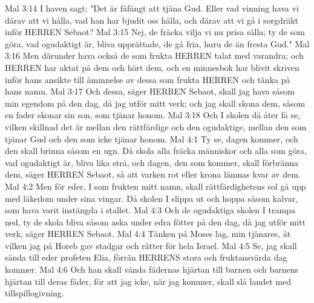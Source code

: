 Mal 3:14  I haven sagt: "Det är fåfängt att tjäna Gud. Eller vad vinning hava vi därav att vi hålla, vad han har bjudit oss hålla, och därav att vi gå i sorgdräkt inför HERREN Sebaot?
Mal 3:15  Nej, de fräcka vilja vi nu prisa sälla; ty de som göra, vad ogudaktigt är, bliva upprättade, de gå fria, huru de än fresta Gud."
Mal 3:16  Men därunder hava också de som frukta HERREN talat med varandra; och HERREN har aktat på dem och hört dem, och en minnesbok har blivit skriven inför hans ansikte till åminnelse av dessa som frukta HERREN och tänka på hans namn.
Mal 3:17  Och dessa, säger HERREN Sebaot, skall jag hava såsom min egendom på den dag, då jag utför mitt verk; och jag skall skona dem, såsom en fader skonar sin son, som tjänar honom.
Mal 3:18  Och I skolen då åter få se, vilken skillnad det är mellan den rättfärdige och den ogudaktige, mellan den som tjänar Gud och den som icke tjänar honom.
Mal 4:1  Ty se, dagen kommer, och den skall brinna såsom en ugn. Då skola alla fräcka människor och alla som göra, vad ogudaktigt är, bliva lika strå, och dagen, den som kommer, skall förbränna dem, säger HERREN Sebaot, så att varken rot eller krona lämnas kvar av dem.
Mal 4:2  Men för eder, I som frukten mitt namn, skall rättfärdighetens sol gå upp med läkedom under sina vingar. Då skolen I slippa ut och hoppa såsom kalvar, som hava varit instängda i stallet.
Mal 4:3  Och de ogudaktiga skolen I trampa ned, ty de skola bliva såsom aska under edra fötter på den dag, då jag utför mitt verk, säger HERREN Sebaot.
Mal 4:4  Tänken på Moses lag, min tjänares, åt vilken jag på Horeb gav stadgar och rätter för hela Israel.
Mal 4:5  Se, jag skall sända till eder profeten Elia, förrän HERRENS stora och fruktansvärda dag kommer.
Mal 4:6  Och han skall vända fädernas hjärtan till barnen och barnens hjärtan till deras fäder, för att jag icke, när jag kommer, skall slå landet med tillspillogivning.


